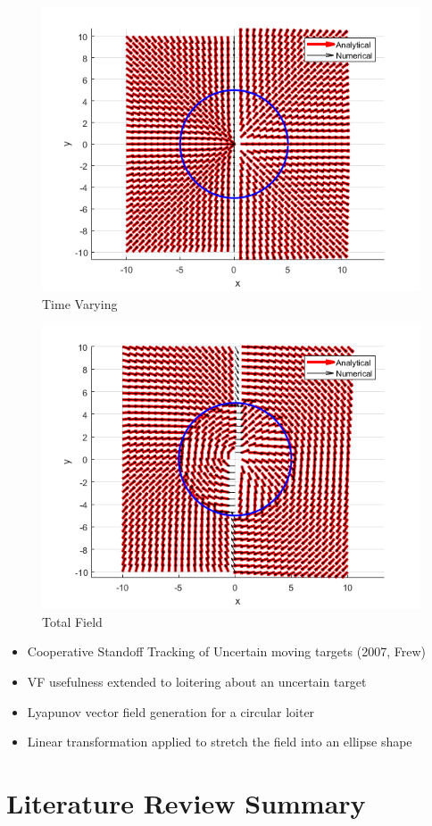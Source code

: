 \documentclass[numbered,pdftex]{ohio-etd}
\begin{document}
\begin{figure}[h]
	\centering
	\includegraphics[width=0.7\linewidth]{"PaperFigures/time varying"}
	\caption{Time Varying}
	\label{fig:time-varying}
\end{figure}


\begin{figure}[h]
	\centering
	\includegraphics[width=0.7\linewidth]{PaperFigures/total}
	\caption{Total Field}
	\label{fig:total}
\end{figure}

\begin{itemize}
	\item Cooperative Standoff Tracking of Uncertain moving targets (2007, Frew)
	\item VF usefulness extended to loitering about an uncertain target
	\item Lyapunov vector field generation for a circular loiter
	\item Linear transformation applied to stretch the field into an ellipse shape
\end{itemize}





\section{Literature Review Summary}

   

\end{document}

